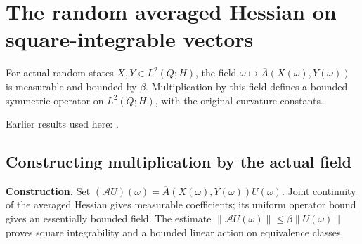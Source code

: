 \documentclass[11pt,a4paper]{report}
\begin{document}
\section{\texorpdfstring{The random averaged Hessian on square-integrable vectors}{The random averaged Hessian on square-integrable vectors}}
\label{proof-module-WassersteinMixing-CurvatureLp-lean}


For actual random states \(X,Y\in L^2(Q;H)\), the field \(\omega\mapsto\overline A(X(\omega),Y(\omega))\) is measurable and bounded by \(\beta\). Multiplication by this field defines a bounded symmetric operator on \(L^2(Q;H)\), with the original curvature constants.



Earlier results used here: \cite[Section~3.13]{LangevinLean2026ULASC}.
\subsection{\texorpdfstring{Constructing multiplication by the actual field}{Constructing multiplication by the actual field}}
\label{report-step-WassersteinMixing-CurvatureLp-lean-1}


\textbf{Construction.} Set \((\mathcal A U)(\omega)=\overline A(X(\omega),Y(\omega))U(\omega)\). Joint continuity of the averaged Hessian gives measurable coefficients; its uniform operator bound gives an essentially bounded field. The estimate \(\|\mathcal A U(\omega)\|\le\beta\|U(\omega)\|\) proves square integrability and a bounded linear action on equivalence classes.
\end{document}
